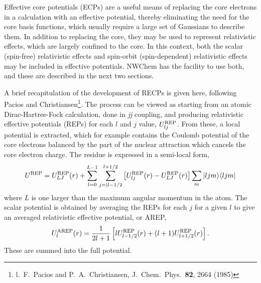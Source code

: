 \label{sec:ecp}
\def\ell{l}
Effective core potentials (ECPs) are a useful means of replacing the core
electrons in a calculation with an effective potential, thereby eliminating
the need for the core basis functions, which usually require a large set of
Gaussians to describe them. In addition to replacing the core, they may be
used to represent relativistic effects, which are largely confined to the
core. In this context, both the scalar (spin-free) relativistic effects and
spin-orbit (spin-dependent) relativistic effects may be included in
effective potentials. NWChem has the facility to use both, and these are
described in the next two sections.

A brief recapitulation of the development of RECPs is given here, following
Pacios and Christiansen\footnote{l.~F.~Pacios and P.~A.~Christiansen,
J.~Chem.~Phys.~{\bf 82}, 2664 (1985)}. The process can be viewed as starting
from an atomic Dirac-Hartree-Fock calculation, done in {\it jj} coupling,
and producing relativistic effective potentials (REPs) for each $\ell$ and
$j$ value, $U^{\rm REP}_{\ell j}$.  From these, a local potential is
extracted, which for example contains the Coulomb potential of the core
electrons balanced by the part of the nuclear attraction which cancels the
core electron charge. The residue is expressed in a semi-local form,
\begin{equation}
U^{\rm REP} = U^{\rm REP}_{LJ}(r) + \sum_{\ell=0}^{L-1}
\sum_{j=|\ell-1/2}^{\ell+1/2} \left[ U^{\rm REP}_{\ell j}(r) -  
U^{\rm REP}_{LJ}(r) \right] \sum_m | \ell j m \rangle \langle \ell j m |
\end{equation}
where $L$ is one larger than the maximum angular momentum in the atom.
The scalar potential is obtained by averaging the REPs for each $j$ for a
given $\ell$ to give an averaged relativistic effective potential, or AREP,
\begin{equation}
U^{\rm AREP}_\ell(r) = \frac{1}{2\ell+1} \left[ \ell U^{\rm REP}_{\ell-1/2}(r)
+ (\ell+1) U^{\rm REP}_{\ell+1/2}(r) \right].
\end{equation}
These are summed into the full potential.


